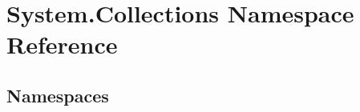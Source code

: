 \hypertarget{namespace_system_1_1_collections}{}\section{System.\+Collections Namespace Reference}
\label{namespace_system_1_1_collections}
\subsection*{Namespaces}
\begin{DoxyCompactItemize}
\end{DoxyCompactItemize}
